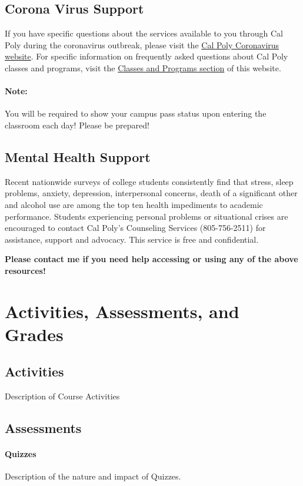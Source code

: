 \documentclass{article}
\begin{document}
\subsection*{Corona Virus Support}
If you have specific questions about the services available to you through Cal Poly during the coronavirus outbreak, please visit the \href{http://coronavirus.calpoly.edu/}{Cal Poly Coronavirus website}. For specific information on frequently asked questions about Cal Poly classes and programs, visit the \href{https://coronavirus.calpoly.edu/classes-and-programs}{Classes and Programs section} of this website.
\paragraph{Note:} You will be required to show your campus pass status upon entering the classroom each day!  Please be prepared!

\subsection*{Mental Health Support}
Recent nationwide surveys of college students consistently find that stress, sleep problems, anxiety, depression, interpersonal concerns, death of a significant other and alcohol use are among the top ten health impediments to academic performance. Students experiencing personal problems or situational crises are encouraged to contact Cal Poly's Counseling Services (805-756-2511) for assistance, support and advocacy. This service is free and confidential.

\textbf{Please contact me if you need help accessing or using any of the above resources!}





\section*{Activities, Assessments, and Grades}
\subsection*{Activities}
Description of Course Activities

\subsection*{Assessments}
\paragraph{Quizzes} Description of the nature and impact of Quizzes.
\end{document}
